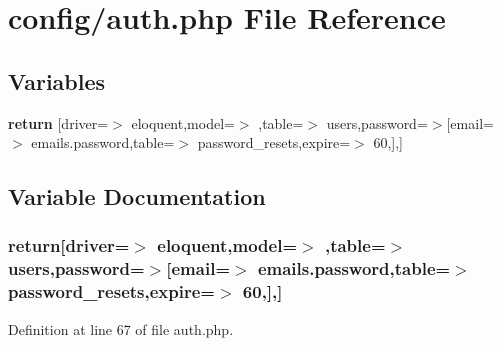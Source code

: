 \section{config/auth.php File Reference}
\label{config_2auth_8php}
\subsection*{Variables}
\begin{DoxyCompactItemize}
\item 
{\bf return} [\textquotesingle{}driver\textquotesingle{}=$>$ \textquotesingle{}eloquent\textquotesingle{},\textquotesingle{}model\textquotesingle{}=$>$ \textquotesingle{},\textquotesingle{}table\textquotesingle{}=$>$ \textquotesingle{}users\textquotesingle{},\textquotesingle{}password\textquotesingle{}=$>$[\textquotesingle{}email\textquotesingle{}=$>$ \textquotesingle{}emails.\+password\textquotesingle{},\textquotesingle{}table\textquotesingle{}=$>$ \textquotesingle{}password\+\_\+resets\textquotesingle{},\textquotesingle{}expire\textquotesingle{}=$>$ 60,],]
\end{DoxyCompactItemize}


\subsection{Variable Documentation}
\subsubsection[{return}]{\setlength{\rightskip}{0pt plus 5cm}return[\textquotesingle{}driver\textquotesingle{}=$>$ \textquotesingle{}eloquent\textquotesingle{},\textquotesingle{}model\textquotesingle{}=$>$ \textquotesingle{},\textquotesingle{}table\textquotesingle{}=$>$ \textquotesingle{}users\textquotesingle{},\textquotesingle{}password\textquotesingle{}=$>$[\textquotesingle{}email\textquotesingle{}=$>$ \textquotesingle{}emails.\+password\textquotesingle{},\textquotesingle{}table\textquotesingle{}=$>$ \textquotesingle{}password\+\_\+resets\textquotesingle{},\textquotesingle{}expire\textquotesingle{}=$>$ 60,],]}\label{config_2auth_8php_a36e6477fe1fb105859b649269d79bf53}


Definition at line 67 of file auth.\+php.

